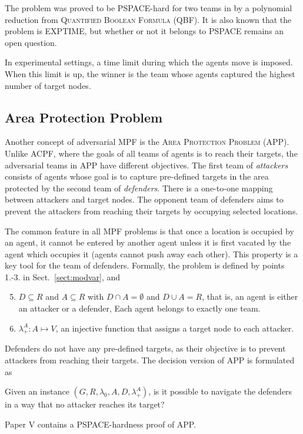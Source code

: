 The problem was proved to be PSPACE-hard for two teams in \cite{ivanova14} by a polynomial reduction from \textsc{Quantified Boolean Formula} (QBF).
It is also known that the problem is EXPTIME, but whether or not it belongs to PSPACE remains an open question.

In experimental settings, a time limit during which the agents move is imposed.
When this limit is up, the winner is the team whose agents captured the highest number of target nodes.

\subsection{Area Protection Problem}

Another concept of adversarial MPF is the \textsc{Area Protection Problem} (APP).
Unlike ACPF, where the goals of all teams of agents is to reach their targets, the adversarial teams in APP have different objectives. 
The first team of \emph{attackers} consists of agents whose goal is to capture pre-defined targets in the area protected by the second team of \emph{defenders}. 
There is a one-to-one mapping between attackers and target nodes.
The opponent team of defenders aims to prevent the attackers from reaching their targets by occupying selected locations.

The common feature in all MPF problems is that once a location is occupied by an agent, 
it cannot be entered by another agent unless it is first vacated by the agent which occupies it (agents cannot push away each other). 
This property is a key tool for the team of defenders.
Formally, the problem is defined by points 1.-3. in Sect.~\ref{sect:modvar}, and
\begin{enumerate}
	\setcounter{enumi}{4}
	\item $D\subseteq R$ and $A\subseteq R$ with $D\cap A=\emptyset$ and $D\cup A=R$, that is, an agent is either an attacker or a defender,
		Each agent belongs to exactly one team. 
	\item $\lambda_+^A:A\mapsto V$, an injective function that assigns a target node to each attacker.
\end{enumerate}

Defenders do not have any pre-defined targets, as their objective is to prevent attackers from reaching their targets.
The decision version of APP is formulated as 
\begin{problem}\label{prob:app}
	Given an instance $(G,R,\lambda_0,A, D, \lambda_+^A)$, is it possible to navigate the defenders in a way that no attacker reaches its target?
\end{problem}
Paper V \cite{ivanova18a} contains a PSPACE-hardness proof of APP.

